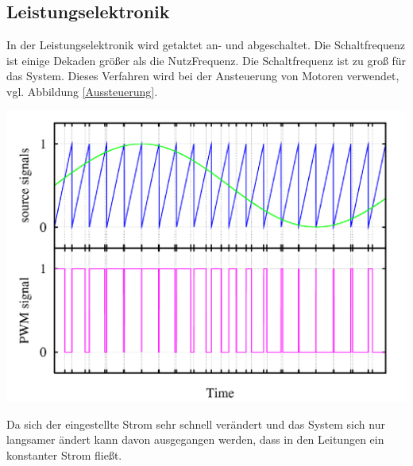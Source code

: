 \documentclass[10pt,a4paper,oneside,abstracton]{scrartcl}
\newenvironment{Figure}
  {\par\medskip\noindent\minipage{\linewidth}}
  {\endminipage\par\medskip}
\begin{document}
\begin{multicols}{2}
\subsection{Leistungselektronik}
In der Leistungselektronik wird getaktet an- und abgeschaltet. 
Die Schaltfrequenz ist einige Dekaden größer als die NutzFrequenz. 
Die Schaltfrequenz ist zu groß für das System. 
Dieses Verfahren wird bei der Ansteuerung von Motoren verwendet, vgl. Abbildung \ref*{Aussteuerung}.
\begin{Figure}
	\includegraphics[width=\textwidth]{Bilder/BLDC_Aussteuerung.png}
	\label{Aussteuerung}
\end{Figure}
\noindent
Da sich der eingestellte Strom sehr schnell verändert und das System sich nur langsamer ändert 
kann davon ausgegangen werden, dass in den Leitungen ein konstanter Strom fließt. 



\end{multicols}
\end{document}
